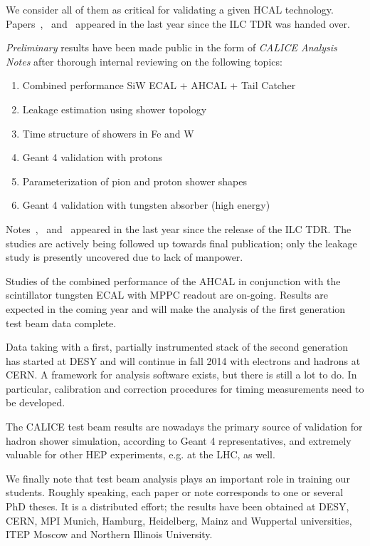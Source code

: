 We consider all of them as critical for validating a given HCAL technology. Papers~\cite{1748-0221-8-07-P07005},~\cite{1748-0221-9-01-P01004} and~\cite{1748-0221-8-09-P09001} appeared in the last year since the ILC TDR was handed over.

\emph{Preliminary} results have been made public in the form of \emph{CALICE Analysis Notes} after thorough internal reviewing on the following topics:
\begin{enumerate}
\item Combined performance SiW ECAL + AHCAL + Tail Catcher ~\cite{2012JInst...7.9017A}
\item Leakage estimation using shower topology~\cite{Marchesini:CAN029}
\item Time structure of showers in Fe and W~\cite{Adloff:2014rya}
\item Geant 4 validation with protons~\cite{Calice:CAN040}
\item Parameterization of pion and proton shower shapes~\cite{Calice:CAN048}
\item Geant 4 validation with tungsten absorber (high energy)~\cite{Calice:CAN044}
\end{enumerate}

Notes~\cite{Calice:CAN040},~\cite{Calice:CAN048} and~\cite{Calice:CAN044} appeared in the last year since the release of the ILC TDR. The studies are actively being followed up towards final publication; only the leakage study is presently uncovered due to lack of manpower.

Studies of the combined performance of the AHCAL in conjunction with the scintillator tungsten ECAL with MPPC readout are on-going. Results are expected in the coming year and will make the analysis of the first generation test beam data complete.

Data taking with a first, partially instrumented stack of the second generation has started at DESY and will continue in fall 2014 with electrons and hadrons at CERN. A framework for analysis software exists, but there is still a lot to do. In particular, calibration and correction procedures for timing measurements need to be developed.

The CALICE test beam results are nowadays the primary source of validation for hadron shower simulation, according to Geant 4 representatives, and extremely valuable for other HEP experiments, e.g. at the LHC, as well.

We finally note that test beam analysis plays an important role in training our students. Roughly speaking, each paper or note corresponds to one or several PhD theses. It is a distributed effort; the results have been obtained at DESY, CERN, MPI Munich, Hamburg, Heidelberg, Mainz and Wuppertal universities, ITEP Moscow and Northern Illinois University.

